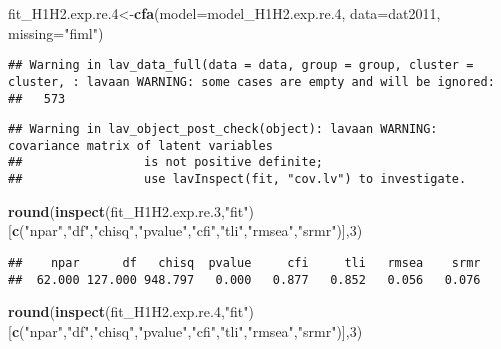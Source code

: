 \documentclass[
]{article}
\newenvironment{Shaded}{\begin{snugshade}}{\end{snugshade}}
\newcommand{\DataTypeTok}[1]{\textcolor[rgb]{0.13,0.29,0.53}{#1}}
\newcommand{\DecValTok}[1]{\textcolor[rgb]{0.00,0.00,0.81}{#1}}
\newcommand{\FloatTok}[1]{\textcolor[rgb]{0.00,0.00,0.81}{#1}}
\newcommand{\KeywordTok}[1]{\textcolor[rgb]{0.13,0.29,0.53}{\textbf{#1}}}
\newcommand{\NormalTok}[1]{#1}
\newcommand{\StringTok}[1]{\textcolor[rgb]{0.31,0.60,0.02}{#1}}
\begin{document}
\begin{Shaded}
\begin{Highlighting}[]
\NormalTok{fit_H1H2.exp.re}\FloatTok{.4}\NormalTok{<-}\KeywordTok{cfa}\NormalTok{(}\DataTypeTok{model=}\NormalTok{model_H1H2.exp.re}\FloatTok{.4}\NormalTok{,}
              \DataTypeTok{data=}\NormalTok{dat2011,}
              \DataTypeTok{missing=}\StringTok{"fiml"}\NormalTok{)}
\end{Highlighting}
\end{Shaded}

\begin{verbatim}
## Warning in lav_data_full(data = data, group = group, cluster = cluster, : lavaan WARNING: some cases are empty and will be ignored:
##   573
\end{verbatim}

\begin{verbatim}
## Warning in lav_object_post_check(object): lavaan WARNING: covariance matrix of latent variables
##                 is not positive definite;
##                 use lavInspect(fit, "cov.lv") to investigate.
\end{verbatim}

\begin{Shaded}
\begin{Highlighting}[]
\KeywordTok{round}\NormalTok{(}\KeywordTok{inspect}\NormalTok{(fit_H1H2.exp.re}\FloatTok{.3}\NormalTok{,}\StringTok{"fit"}\NormalTok{)}
\NormalTok{      [}\KeywordTok{c}\NormalTok{(}\StringTok{"npar"}\NormalTok{,}\StringTok{"df"}\NormalTok{,}\StringTok{"chisq"}\NormalTok{,}\StringTok{"pvalue"}\NormalTok{,}\StringTok{"cfi"}\NormalTok{,}\StringTok{"tli"}\NormalTok{,}\StringTok{"rmsea"}\NormalTok{,}\StringTok{"srmr"}\NormalTok{)],}\DecValTok{3}\NormalTok{)}
\end{Highlighting}
\end{Shaded}

\begin{verbatim}
##    npar      df   chisq  pvalue     cfi     tli   rmsea    srmr 
##  62.000 127.000 948.797   0.000   0.877   0.852   0.056   0.076
\end{verbatim}

\begin{Shaded}
\begin{Highlighting}[]
\KeywordTok{round}\NormalTok{(}\KeywordTok{inspect}\NormalTok{(fit_H1H2.exp.re}\FloatTok{.4}\NormalTok{,}\StringTok{"fit"}\NormalTok{)}
\NormalTok{      [}\KeywordTok{c}\NormalTok{(}\StringTok{"npar"}\NormalTok{,}\StringTok{"df"}\NormalTok{,}\StringTok{"chisq"}\NormalTok{,}\StringTok{"pvalue"}\NormalTok{,}\StringTok{"cfi"}\NormalTok{,}\StringTok{"tli"}\NormalTok{,}\StringTok{"rmsea"}\NormalTok{,}\StringTok{"srmr"}\NormalTok{)],}\DecValTok{3}\NormalTok{)}
\end{Highlighting}
\end{Shaded}
\end{document}
